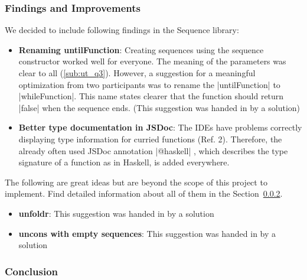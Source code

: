 \subsubsection{Findings and Improvements} %
\label{subsub:seq_findings_and_improvements}
We decided to include following findings in the Sequence library:
\begin{itemize}
  \item \textbf{Renaming untilFunction}: Creating sequences using the sequence
    constructor worked well for everyone. The meaning of the parameters was
    clear to all (\ref{sub:ut_q3}). However, a suggestion for a meaningful
    optimization from two participants was to rename the |untilFunction| to
    |whileFunction|. This name states clearer that the function should return
    |false| when the sequence ends. (This suggestion was handed in by a
    solution)
  \item \textbf{Better type documentation in JSDoc}: The IDEs have problems
    correctly displaying type information for curried functions (Ref. 2).
    Therefore, the already often used JSDoc annotation |@haskell| , which
    describes the type signature of a function as in Haskell, is added
    everywhere.
\end{itemize}
The following are great ideas but are beyond the scope of this project to
implement. Find detailed information about all of them in the
Section~\ref{}. %
\begin{itemize}
  \item \textbf{unfoldr}: This suggestion was handed in by a solution
  \item \textbf{uncons with empty sequences}: This suggestion was handed in by a solution
\end{itemize}

\subsubsection{Conclusion} %

